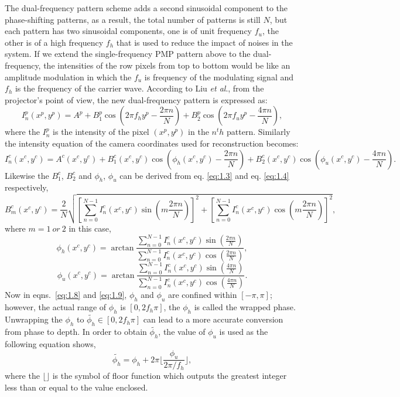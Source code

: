 \documentclass[]{spie}  %
\begin{document}
The dual-frequency pattern scheme adds a second sinusoidal component to the phase-shifting patterns, as a result, the total number of patterns is still $N$, but each pattern has two sinusoidal components, one is of unit frequency $f_u$, the other is of a high frequency $f_h$ that is used to reduce the impact of noises in the system. If we extend the single-frequency PMP pattern above to the dual-frequency, the intensities of the row pixels from top to bottom would be like an amplitude modulation in which the $f_u$ is frequency of the modulating signal and $f_h$ is the frequency of the carrier wave. According to Liu \textit{et al}., from the projector's point of view, the new dual-frequency pattern is expressed as:
  \begin{equation} \label{eq:1.5}
  	I^p_n(x^p, y^p) = A^p + B^p_1\cos(2\pi f_h y^p - \frac{2\pi n}{N}) + B^p_2\cos(2\pi f_u y^p - \frac{4\pi n}{N}),
  \end{equation}
where the $I^p_n$ is the intensity of the pixel $(x^p, y^p)$ in the $n^th$ pattern. Similarly the intensity equation of the camera coordinates used for reconstruction becomes:
 \begin{equation} \label{eq:1.6}
  	I^c_n(x^c, y^c) =  A^c(x^c, y^c) + B^c_1(x^c, y^c)\cos(\phi_h(x^c, y^c) - \frac{2\pi n}{N}) + B^c_2(x^c, y^c)\cos(\phi_u(x^c, y^c) - \frac{4\pi n}{N}).
  \end{equation}
Likewise the $B^c_1$, $B^c_2$ and $\phi_h$, $\phi_u$ can be derived from eq. \eqref{eq:1.3} and eq. \eqref{eq:1.4} respectively,
  \begin{equation} \label{eq:1.7}
  	B^c_m(x^c, y^c) = \frac{2}{N}\sqrt{\left[\sum_{n=0}^{N-1}I_n^c(x^c, y^c)\sin (m\frac{2\pi n}{N})\right]^2 + \left[\sum_{n=0}^{N-1}I_n^c(x^c, y^c)\cos (m\frac{2\pi n}{N})\right]^2},
  \end{equation}
where $m = 1\: or\: 2$ in this case,
 \begin{equation} \label{eq:1.8}
  	\phi_h (x^c, y^c) = \arctan \frac{\sum_{n=0}^{N-1} I^c_n(x^c, y^c)\sin(\frac{2\pi n}{N})}{\sum_{n=0}^{N-1} I^c_n(x^c, y^c)\cos(\frac{2\pi n}{N})},
  \end{equation}
 \begin{equation} \label{eq:1.9}
  	\phi_u (x^c, y^c) = \arctan \frac{\sum_{n=0}^{N-1} I^c_n(x^c, y^c)\sin(\frac{4\pi n}{N})}{\sum_{n=0}^{N-1} I^c_n(x^c, y^c)\cos(\frac{4\pi n}{N})}.
  \end{equation}
Now in eqns.~\eqref{eq:1.8} and \eqref{eq:1.9}, $\phi_h$ and $\phi_u$ are confined within $[-\pi, \pi]$; however, the actual range of $\phi_h$ is $[0, 2f_h\pi]$, the  $\phi_h$ is called the wrapped phase. Unwrapping the $\phi_h$ to $\tilde{\phi_h} \in [0, 2f_h\pi]$ can lead to a more accurate conversion from phase to depth.  In order to obtain $\tilde{\phi_h}$, the value of $\phi_u$ is used as the following equation shows,
  \begin{equation} \label{eq:1.10}
	 \tilde{\phi_h} = \phi_h + 2\pi \lfloor\frac{\phi_u}{2\pi/f_h}\rfloor,
  \end{equation}
where the $\lfloor \rfloor$ is the symbol of floor function which outputs the greatest integer less than or equal to the value enclosed.
\end{document}

